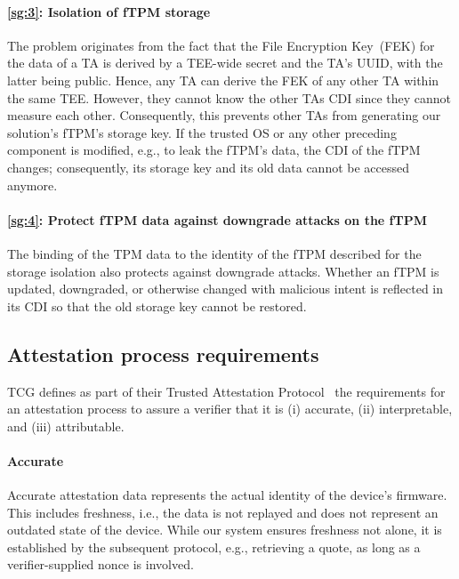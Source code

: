 \paragraph{\ref{sg:3}: Isolation of fTPM storage}
The problem originates from the fact that the File Encryption Key~(FEK) for the data of a TA is derived by a TEE-wide secret and the TA's UUID, with the latter being public.
Hence, any TA can derive the FEK of any other TA within the same TEE\@.
However, they cannot know the other TAs CDI since they cannot measure each other.
Consequently, this prevents other \acp{TA} from generating our solution's fTPM's storage key.
If the trusted OS or any other preceding component is modified, e.g., to leak the fTPM's data, the CDI of the fTPM changes; consequently, its storage key and its old data cannot be accessed anymore.

\paragraph{\ref{sg:4}: Protect fTPM data against downgrade attacks on the fTPM}
The binding of the TPM data to the identity of the fTPM described for the storage isolation also protects against downgrade attacks.
Whether an fTPM is updated, downgraded, or otherwise changed with malicious intent is reflected in its CDI so that the old storage key cannot be restored.

\subsection{Attestation process requirements}


\Ac{TCG} defines as part of their Trusted Attestation Protocol~\cite{tap} the requirements for an attestation process to assure a verifier that it is (i) accurate, (ii) interpretable, and (iii) attributable.

\paragraph{Accurate}
Accurate attestation data represents the actual identity of the device's firmware.
This includes freshness, i.e., the data is not replayed and does not represent an outdated state of the device.
While our system ensures freshness not alone, it is established by the subsequent protocol, e.g., retrieving a quote, as long as a verifier-supplied nonce is involved.

